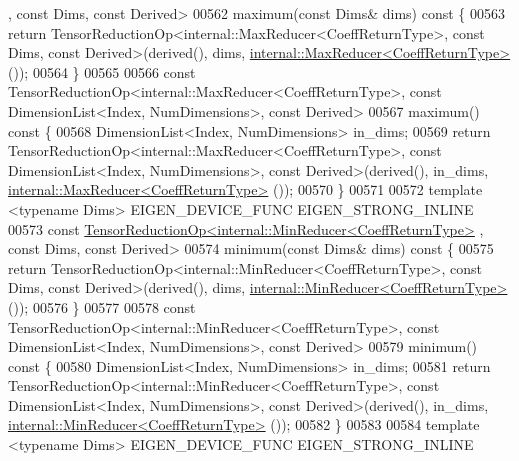 \begin{DoxyCode}
      , \textcolor{keyword}{const} Dims, \textcolor{keyword}{const} Derived>
00562     maximum(\textcolor{keyword}{const} Dims& dims)\textcolor{keyword}{ const }\{
00563       \textcolor{keywordflow}{return} TensorReductionOp<internal::MaxReducer<CoeffReturnType>, \textcolor{keyword}{const} Dims, \textcolor{keyword}{const} Derived>(derived(),
       dims, \hyperlink{struct_eigen_1_1internal_1_1_max_reducer}{internal::MaxReducer<CoeffReturnType>}());
00564     \}
00565 
00566     \textcolor{keyword}{const} TensorReductionOp<internal::MaxReducer<CoeffReturnType>, \textcolor{keyword}{const} DimensionList<Index,
       NumDimensions>, \textcolor{keyword}{const} Derived>
00567     maximum()\textcolor{keyword}{ const }\{
00568       DimensionList<Index, NumDimensions> in\_dims;
00569       \textcolor{keywordflow}{return} TensorReductionOp<internal::MaxReducer<CoeffReturnType>, \textcolor{keyword}{const} DimensionList<Index,
       NumDimensions>, \textcolor{keyword}{const} Derived>(derived(), in\_dims, \hyperlink{struct_eigen_1_1internal_1_1_max_reducer}{internal::MaxReducer<CoeffReturnType>}
      ());
00570     \}
00571 
00572     \textcolor{keyword}{template} <\textcolor{keyword}{typename} Dims> EIGEN\_DEVICE\_FUNC EIGEN\_STRONG\_INLINE
00573     \textcolor{keyword}{const} \hyperlink{class_eigen_1_1_tensor_reduction_op}{TensorReductionOp<internal::MinReducer<CoeffReturnType>}
      , \textcolor{keyword}{const} Dims, \textcolor{keyword}{const} Derived>
00574     minimum(\textcolor{keyword}{const} Dims& dims)\textcolor{keyword}{ const }\{
00575       \textcolor{keywordflow}{return} TensorReductionOp<internal::MinReducer<CoeffReturnType>, \textcolor{keyword}{const} Dims, \textcolor{keyword}{const} Derived>(derived(),
       dims, \hyperlink{struct_eigen_1_1internal_1_1_min_reducer}{internal::MinReducer<CoeffReturnType>}());
00576     \}
00577 
00578     \textcolor{keyword}{const} TensorReductionOp<internal::MinReducer<CoeffReturnType>, \textcolor{keyword}{const} DimensionList<Index,
       NumDimensions>, \textcolor{keyword}{const} Derived>
00579     minimum()\textcolor{keyword}{ const }\{
00580       DimensionList<Index, NumDimensions> in\_dims;
00581       \textcolor{keywordflow}{return} TensorReductionOp<internal::MinReducer<CoeffReturnType>, \textcolor{keyword}{const} DimensionList<Index,
       NumDimensions>, \textcolor{keyword}{const} Derived>(derived(), in\_dims, \hyperlink{struct_eigen_1_1internal_1_1_min_reducer}{internal::MinReducer<CoeffReturnType>}
      ());
00582     \}
00583 
00584     \textcolor{keyword}{template} <\textcolor{keyword}{typename} Dims> EIGEN\_DEVICE\_FUNC EIGEN\_STRONG\_INLINE

\end{DoxyCode}
